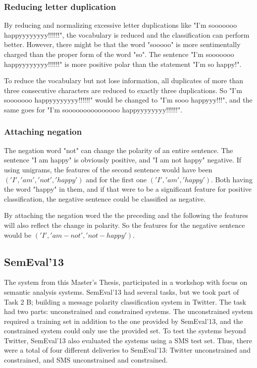 \subsubsection{Reducing letter duplication}
By reducing and normalizing excessive letter duplications like "I'm sooooooo happyyyyyyyy!!!!!!", the vocabulary is reduced and the classification can perform better. However, there might be that the word "sooooo" is more sentimentally charged than the proper form of the word "so". The sentence "I'm sooooooo happyyyyyyyy!!!!!!" is more positive polar than the statement "I'm so happy!". 

To reduce the vocabulary but not lose information, all duplicates of more than three consecutive characters are reduced to exactly three duplications. So "I'm sooooooo happyyyyyyyy!!!!!!" would be changed to "I'm sooo happyyy!!!", and the same goes for "I'm sooooooooooooooo happyyyyyyyy!!!!!!".

\subsubsection{Attaching negation}

The negation word "not" can change the polarity of an entire sentence. The sentence "I am happy" is obviously positive, and "I am not happy" negative. If using unigrams, the features of the second sentence would have been $('I', 'am', 'not', 'happy')$ and for the first one $('I', 'am', 'happy')$. Both having the word "happy" in them, and if that were to be a significant feature for positive classification, the negative sentence could be classified as negative. 

By attaching the negation word the the preceding and the following the features will also reflect the change in polarity. So the features for the negative sentence would be $('I', 'am-not', 'not-happy')$.

\subsection{SemEval'13}

The system from this Master's Thesis, participated in a workshop with focus on semantic analysis systems. SemEval'13 had several tasks, but we took part of Task 2 B; building a message polarity classification system in Twitter. The task had two parts: unconstrained and constrained systems. The unconstrained system required a training set in addition to the one provided by SemEval'13, and the constrained system could only use the provided set. To test the systems beyond Twitter, SemEval'13 also evaluated the systems using a SMS test set. Thus, there were a total of four different deliveries to SemEval'13: Twitter unconstrained and constrained, and SMS unconstrained and constrained.

